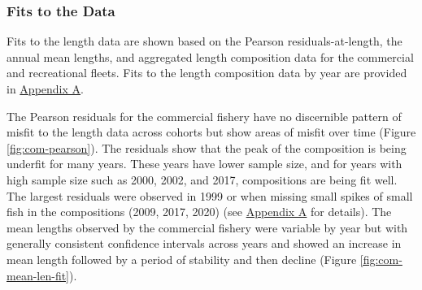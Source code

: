 \documentclass[11pt,
  english,
  a4paper,
]{article}
\begin{document}
\leavevmode\tagmcend\tagstructend\par


\hypertarget{fits-to-the-data}{%
\subsubsection{Fits to the Data}\label{fits-to-the-data}}

\leavevmode\tagmcend\tagstructend


Fits to the length data are shown based on the Pearson residuals-at-length, the annual mean lengths, and aggregated length composition data for the commercial and recreational fleets. Fits to the length composition data by year are provided in {\protect\hyperlink{append_a}{Appendix A}\leavevmode\tagmcend\tagstructend}.

\leavevmode\tagmcend\tagstructend\par


The Pearson residuals for the commercial fishery have no discernible pattern of misfit to the length data across cohorts but show areas of misfit over time (Figure \ref{fig:com-pearson}). The residuals show that the peak of the composition is being underfit for many years. These years have lower sample size, and for years with high sample size such as 2000, 2002, and 2017, compositions are being fit well. The largest residuals were observed in 1999 or when missing small spikes of small fish in the compositions (2009, 2017, 2020) (see {\protect\hyperlink{append_a}{Appendix A}\leavevmode\tagmcend\tagstructend} for details). The mean lengths observed by the commercial fishery were variable by year but with generally consistent confidence intervals across years and showed an increase in mean length followed by a period of stability and then decline (Figure \ref{fig:com-mean-len-fit}).

\leavevmode\tagmcend\tagstructend\par

\end{document}
